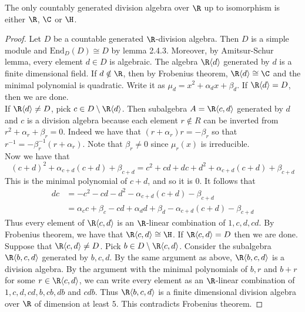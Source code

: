 \documentclass[a4paper]{article}
\begin{document}
\begin{thm}{}{} The only countably generated division algebra over $\R$ up to isomorphism is either $\R$, $\C$ or $\H$. 
\begin{proof}
Let $D$ be a countable generated $\R$-division algebra. Then $D$ is a simple module and $\text{End}_D(D)\cong D$ by lemma 2.4.3. Moreover, by Amitsur-Schur lemma, every element $d\in D$ is algebraic. The algebra $\R\langle d\rangle$ generated by $d$ is a finite dimensional field. If $d\notin\R$, then by Frobenius theorem, $\R\langle d\rangle\cong\C$ and the minimal polynomial is quadratic. Write it as $\mu_d=x^2+\alpha_dx+\beta_d$. If $\R\langle d\rangle=D$, then we are done. \\

If $\R\langle d\rangle\neq D$, pick $c\in D\setminus\R\langle d\rangle$. Then subalgebra $A=\R\langle c,d\rangle$ generated by $d$ and $c$ is a division algebra because each element $r\notin R$ can be inverted from $r^2+\alpha_r+\beta_r=0$. Indeed we have that $(r+\alpha_r)r=-\beta_r$ so that $r^{-1}=-\beta_r^{-1}(r+\alpha_r)$. Note that $\beta_r\neq0$ since $\mu_r(x)$ is irreducible. \\

Now we have that $$(c+d)^2+\alpha_{c+d}(c+d)+\beta_{c+d}=c^2+cd+dc+d^2+\alpha_{c+d}(c+d)+\beta_{c+d}$$ This is the minimal polynomial of $c+d$, and so it is $0$. It follows that 
\begin{align*}
dc&=-c^2-cd-d^2-\alpha_{c+d}(c+d)-\beta_{c+d}\\
&=\alpha_cc+\beta_c-cd+\alpha_dd+\beta_d-\alpha_{c+d}(c+d)-\beta_{c+d}
\end{align*}
Thus every element of $\R\langle c,d\rangle$ is an $\R$-linear combination of $1,c,d,cd$. By Frobenius theorem, we have that $\R\langle c,d\rangle\cong\H$. If $\R\langle c,d\rangle=D$ then we are done. \\

Suppose that $\R\langle c,d\rangle\neq D$. Pick $b\in D\setminus\R\langle c,d\rangle$. Consider the subalgebra $\R\langle b,c,d\rangle$ generated by $b,c,d$. By the same argument as above, $\R\langle b,c,d\rangle$ is a division algebra. By the argument with the minimal polynomials of $b,r$ and $b+r$ for some $r\in\R\langle c,d\rangle$, we can write every element as an $\R$-linear combination of $1,c,d,cd,b,cb,db$ and $cdb$. Thus $\R\langle b,c,d\rangle$ is a finite dimensional division algebra over $\R$ of dimension at least $5$. This contradicts Frobenius theorem. 
\end{proof}
\end{thm}
\end{document}
